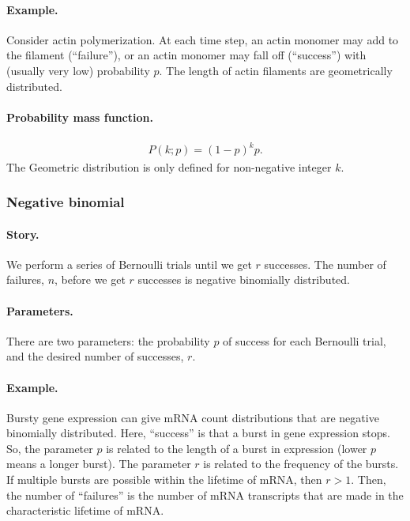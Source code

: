 \paragraph{Example.} Consider actin polymerization.  At each time
step, an actin monomer may add to the filament (``failure''), or an
actin monomer may fall off (``success'') with (usually very low)
probability $p$.  The length of actin filaments are geometrically
distributed.
\paragraph{Probability mass function.}
\begin{align}
P(k;p) = (1-p)^k p.
\end{align}
The Geometric distribution is only defined for non-negative
integer $k$.



\subsubsection{Negative binomial}
\paragraph{Story.} We perform a series of Bernoulli trials until we
get $r$ successes.  The number of failures, $n$, before we get $r$
successes is negative binomially distributed.
\paragraph{Parameters.} There are two parameters: the probability $p$
of success for each Bernoulli trial, and the desired number of
successes, $r$.
\paragraph{Example.} Bursty gene expression can give mRNA count
distributions that are negative binomially distributed.  Here,
``success'' is that a burst in gene expression stops.  So, the
parameter $p$ is related to the length of a burst in expression (lower
$p$ means a longer burst).  The parameter $r$ is related to the
frequency of the bursts.  If multiple bursts are possible within the
lifetime of mRNA, then $r > 1$.  Then, the number of ``failures'' is
the number of mRNA transcripts that are made in the characteristic
lifetime of mRNA.
